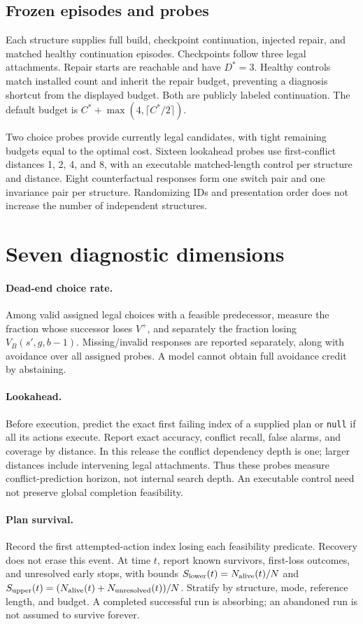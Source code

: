 \documentclass[10pt,twocolumn]{article}
\begin{document}
\subsection{Frozen episodes and probes}
Each structure supplies full build, checkpoint continuation, injected repair,
and matched healthy continuation episodes. Checkpoints follow three legal
attachments. Repair starts are reachable and have $D^*=3$. Healthy controls
match installed count and inherit the repair budget, preventing a diagnosis
shortcut from the displayed budget. Both are publicly labeled continuation.
The default budget is $C^*+\max(4,\lceil C^*/2\rceil)$.

Two choice probes provide currently legal candidates, with tight remaining
budgets equal to the optimal cost. Sixteen lookahead probes use first-conflict
distances 1, 2, 4, and 8, with an executable matched-length control per structure
and distance. Eight counterfactual responses form one switch pair and one
invariance pair per structure. Randomizing IDs and presentation order does not
increase the number of independent structures.

\section{Seven diagnostic dimensions}
\paragraph{Dead-end choice rate.}
Among valid assigned legal choices with a feasible predecessor, measure the
fraction whose successor loses $V^+$, and separately the fraction losing
$V_B(s',g,b-1)$. Missing/invalid responses are reported separately, along with
avoidance over all assigned probes. A model cannot obtain full avoidance credit
by abstaining.

\paragraph{Lookahead.}
Before execution, predict the exact first failing index of a supplied plan or
\texttt{null} if all its actions execute. Report exact accuracy, conflict recall,
false alarms, and coverage by distance. In this release the conflict dependency
depth is one; larger distances include intervening legal attachments. Thus these
probes measure conflict-prediction horizon, not internal search depth. An
executable control need not preserve global completion feasibility.

\paragraph{Plan survival.}
Record the first attempted-action index losing each feasibility predicate.
Recovery does not erase this event. At time $t$, report known survivors,
first-loss outcomes, and unresolved early stops, with bounds
$S_{\rm lower}(t)=N_{\rm alive}(t)/N$ and
$S_{\rm upper}(t)=(N_{\rm alive}(t)+N_{\rm unresolved}(t))/N$.
Stratify by structure, mode, reference length, and budget. A completed successful
run is absorbing; an abandoned run is not assumed to survive forever.
\end{document}
